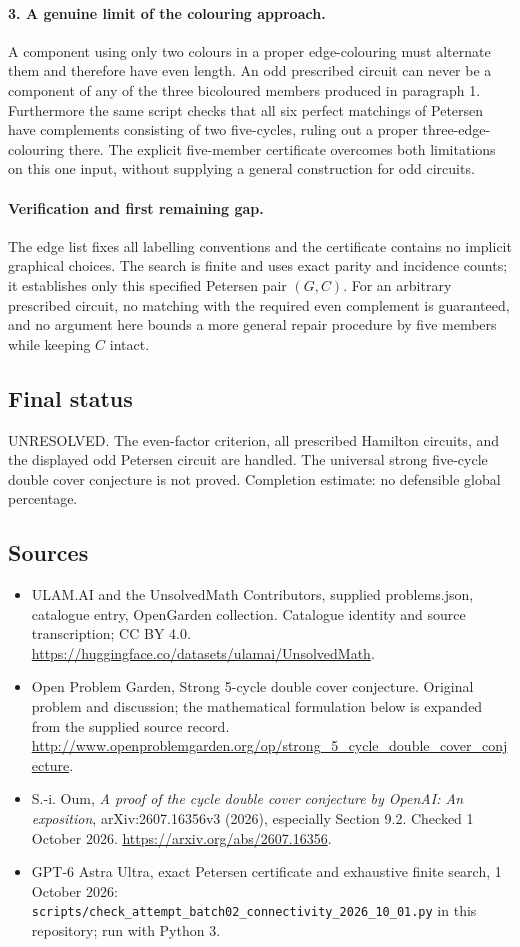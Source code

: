 \documentclass[11pt,a4paper]{article}
\begin{document}
\paragraph{3. A genuine limit of the colouring approach.}
A component using only two colours in a proper edge-colouring must
alternate them and therefore have even length. An odd prescribed
circuit can never be a component of any of the three bicoloured
members produced in paragraph 1. Furthermore the same script checks
that all six perfect matchings of Petersen have complements consisting
of two five-cycles, ruling out a proper three-edge-colouring there.
The explicit five-member certificate overcomes both limitations on this
one input, without supplying a general construction for odd circuits.

\paragraph{Verification and first remaining gap.}
The edge list fixes all labelling conventions and the certificate
contains no implicit graphical choices. The search is finite and
uses exact parity and incidence counts; it establishes only this
specified Petersen pair $(G,C)$. For an arbitrary prescribed circuit,
no matching with the required even complement is guaranteed, and
no argument here bounds a more general repair procedure by five
members while keeping $C$ intact.

\subsection{Final status}
UNRESOLVED. The even-factor criterion, all prescribed Hamilton circuits,
and the displayed odd Petersen circuit are handled. The universal
strong five-cycle double cover conjecture is not proved. Completion
estimate: no defensible global percentage.

\subsection{Sources}
\begin{itemize}
\item[S1] ULAM.AI and the UnsolvedMath Contributors, supplied problems.json, catalogue entry, OpenGarden collection. Catalogue identity and source transcription; CC BY 4.0.
\url{https://huggingface.co/datasets/ulamai/UnsolvedMath}.
\item[S2] Open Problem Garden, Strong 5-cycle double cover conjecture. Original problem and discussion; the mathematical formulation below is expanded from the supplied source record.
\url{http://www.openproblemgarden.org/op/strong_5_cycle_double_cover_conjecture}.
\item[S3] S.-i. Oum, \emph{A proof of the cycle double cover conjecture by OpenAI: An exposition}, arXiv:2607.16356v3 (2026), especially Section 9.2. Checked 1 October 2026.
\url{https://arxiv.org/abs/2607.16356}.
\item[S4] GPT-6 Astra Ultra, exact Petersen certificate and exhaustive finite search, 1 October 2026: \texttt{scripts/check\_attempt\_batch02\_connectivity\_2026\_10\_01.py} in this repository; run with Python 3.
\end{itemize}
\end{document}
